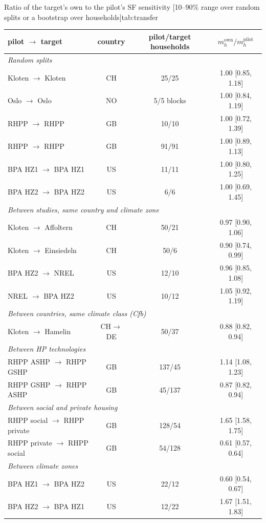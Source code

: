 \begin{autotable}{Ratio of the target's own to the pilot's SF sensitivity [10--90\% range over random splits or a bootstrap over households]}{tab:transfer}
\setlength{\tabcolsep}{2.5pt}
\begin{tabular}{lccc}
\toprule
pilot $\rightarrow$ target & country & pilot/target households & $m_h^{\mathrm{own}}/m_h^{\mathrm{pilot}}$ \\
\midrule
\multicolumn{4}{l}{\textit{Random splits}} \\
Kloten $\rightarrow$ Kloten & CH & 25/25 & 1.00 [0.85, 1.18] \\
Oslo $\rightarrow$ Oslo & NO & 5/5 blocks & 1.00 [0.84, 1.19] \\
RHPP $\rightarrow$ RHPP & GB & 10/10 & 1.00 [0.72, 1.39] \\
RHPP $\rightarrow$ RHPP & GB & 91/91 & 1.00 [0.89, 1.13] \\
BPA HZ1 $\rightarrow$ BPA HZ1 & US & 11/11 & 1.00 [0.80, 1.25] \\
BPA HZ2 $\rightarrow$ BPA HZ2 & US & 6/6 & 1.00 [0.69, 1.45] \\
\midrule
\multicolumn{4}{l}{\textit{Between studies, same country and climate zone}} \\
Kloten $\rightarrow$ Affoltern & CH & 50/21 & 0.97 [0.90, 1.06] \\
Kloten $\rightarrow$ Einsiedeln & CH & 50/6 & 0.90 [0.74, 0.99] \\
BPA HZ2 $\rightarrow$ NREL & US & 12/10 & 0.96 [0.85, 1.08] \\
NREL $\rightarrow$ BPA HZ2 & US & 10/12 & 1.05 [0.92, 1.19] \\
\midrule
\multicolumn{4}{l}{\textit{Between countries, same climate class (Cfb)}} \\
Kloten $\rightarrow$ Hamelin & CH$\rightarrow$DE & 50/37 & 0.88 [0.82, 0.94] \\
\midrule
\multicolumn{4}{l}{\textit{Between HP technologies}} \\
RHPP ASHP $\rightarrow$ RHPP GSHP & GB & 137/45 & 1.14 [1.08, 1.23] \\
RHPP GSHP $\rightarrow$ RHPP ASHP & GB & 45/137 & 0.87 [0.82, 0.94] \\
\midrule
\multicolumn{4}{l}{\textit{Between social and private housing}} \\
RHPP social $\rightarrow$ RHPP private & GB & 128/54 & 1.65 [1.58, 1.75] \\
RHPP private $\rightarrow$ RHPP social & GB & 54/128 & 0.61 [0.57, 0.64] \\
\midrule
\multicolumn{4}{l}{\textit{Between climate zones}} \\
BPA HZ1 $\rightarrow$ BPA HZ2 & US & 22/12 & 0.60 [0.54, 0.67] \\
BPA HZ2 $\rightarrow$ BPA HZ1 & US & 12/22 & 1.67 [1.51, 1.83] \\
\bottomrule
\end{tabular}
\end{autotable}